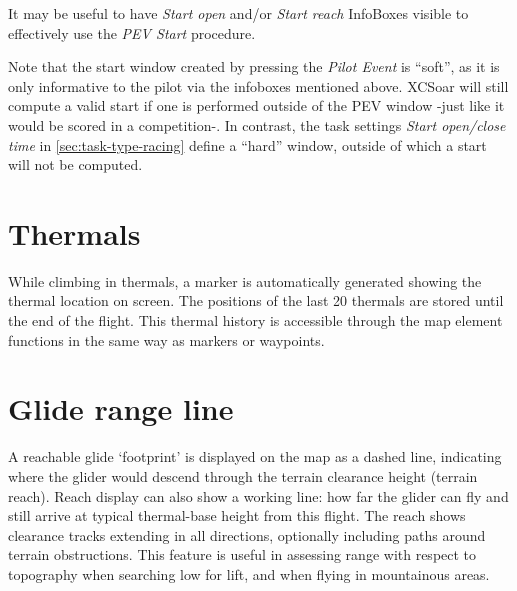 \tip It may be useful to have \emph{Start open} and/or \emph{Start reach}
 InfoBoxes visible to effectively use the \emph{PEV Start} procedure.

\tip Note that the start window created by pressing the \emph{Pilot Event}
is ``soft'', as it is only informative to the pilot via the infoboxes mentioned above.
XCSoar will still compute a valid start if one is performed outside of 
the PEV window -just like it would be scored in a competition-. In contrast,
the task settings \emph{Start open/close time} in \ref{sec:task-type-racing} define
a ``hard'' window, outside of which a start will not be computed.


\section{Thermals}

While climbing in thermals, a marker is automatically generated showing the
thermal location on screen.    The positions of the last 20 thermals are
stored until the end of the flight.
This thermal history is accessible through the map
element functions in the same way as markers or waypoints.


\section{Glide range line}\label{sec:reach}

A reachable glide `footprint' is displayed on the map as a dashed line,
indicating where the glider would descend through the terrain clearance
height (terrain reach).  Reach display can also show a working line: how
far the glider can fly and still arrive at typical thermal-base height
from this flight.  The reach shows clearance tracks extending in all
directions, optionally including paths around terrain obstructions.
This feature is useful in assessing range with respect to topography when
searching low for lift, and when flying in mountainous areas.

